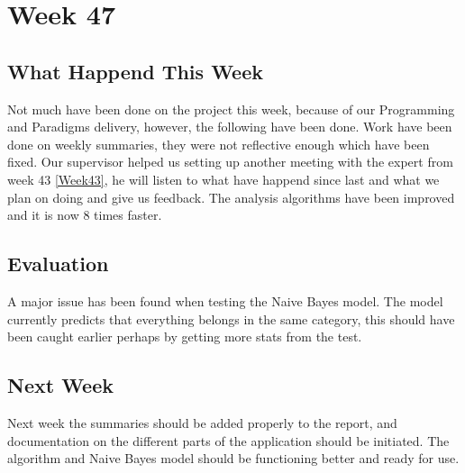 \section*{Week 47}
\subsection*{What Happend This Week}
Not much have been done on the project this week, because of our Programming
and Paradigms delivery, however, the following have been done.
Work have been done on weekly summaries, they were not reflective enough which
have been fixed.
Our supervisor helped us setting up another meeting with the expert from week 43
\ref{Week43}, he will listen to what have happend since last and what we plan on
doing and give us feedback. The analysis algorithms have been improved and it is
now 8 times faster.

\subsection*{Evaluation}
A major issue has been found when testing the Naive Bayes model. The model
currently predicts that everything belongs in the same category, this should
have been caught earlier perhaps by getting more stats from the test. 

\subsection*{Next Week}
Next week the summaries should be added properly to the report, and
documentation on the different parts of the application should be initiated. The
algorithm and Naive Bayes model should be functioning better and ready for use.


% 
% 
% 
